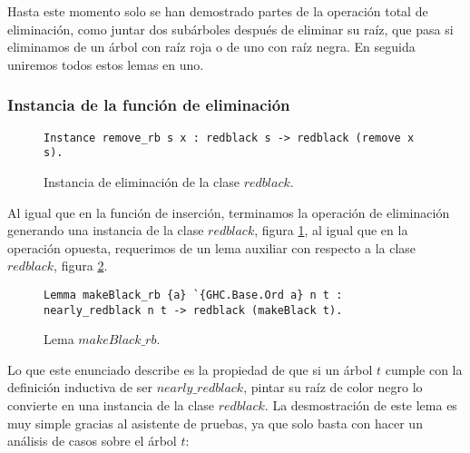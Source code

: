 Hasta este momento solo se han demostrado partes de la operación total de eliminación, como juntar
dos subárboles despu\'es de eliminar su ra\'iz, que pasa si eliminamos de un árbol con raíz roja o
de uno con raíz negra. En seguida uniremos todos estos lemas en uno.

\subsubsection{Instancia de la funci\'on de eliminaci\'on}

\begin{figure}[!ht]
\centering
\captionsetup{justification=centering}
\begin{verbatim}
Instance remove_rb s x : redblack s -> redblack (remove x s).
\end{verbatim}
\caption{Instancia de eliminaci\'on de la clase $redblack$.}
\label{instance_del}
\end{figure}


Al igual que en la funci\'on de inserción, terminamos la operación de eliminaci\'on generando una
instancia de la clase $redblack$, figura \ref{instance_del}, al igual que en la operación opuesta,
requerimos de un lema auxiliar con respecto a la clase $redblack$, figura \ref{lema_7}.

\begin{figure}[!ht]
\centering
\captionsetup{justification=centering}
\begin{verbatim}
Lemma makeBlack_rb {a} `{GHC.Base.Ord a} n t :
nearly_redblack n t -> redblack (makeBlack t).
\end{verbatim}
\caption{Lema $makeBlack\_rb$.}
\label{lema_7}
\end{figure}


Lo que este enunciado describe es la propiedad de que si un \'arbol $t$ cumple con la definici\'on
inductiva de ser $nearly\_redblack$, pintar su raíz de color negro lo convierte en una instancia de
la clase $redblack$. La desmostraci\'on de este lema es muy simple gracias al asistente de pruebas,
ya que solo basta con hacer un análisis de casos sobre el \'arbol $t$:

